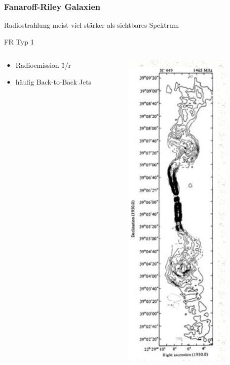 \documentclass[aspectratio=1610, 9pt]{beamer}
\begin{document}
\begin{frame}\frametitle{Fanaroff-Riley Galaxien}
Radiostrahlung meist viel st\"arker als sichtbares Spektrum
  \begin{block}{FR Typ 1}
  \begin{columns}
  \begin{column}{0.45\textwidth}
    \begin{itemize}
      \item Radioemission \~ 1/r
      \item h\"aufig Back-to-Back Jets
    \end{itemize}
  \end{column}
  \begin{column}{0.45\textwidth}
    \includegraphics{images/FR1.png}
  \end{column}
  \end{columns}
  \end{block}
\end{frame}
\end{document}
